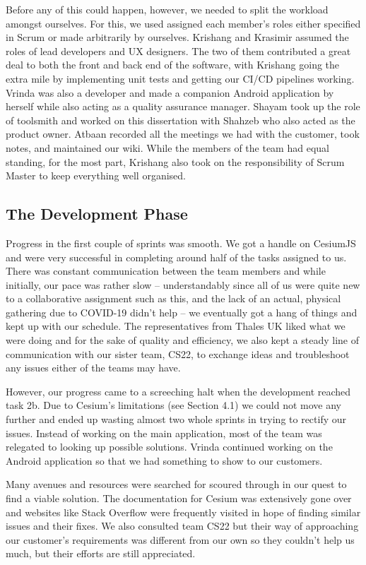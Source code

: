 \documentclass{l3proj}
\begin{document}
Before any of this could happen, however, we needed to split the workload amongst ourselves. For this, we used assigned each member's roles either specified in Scrum or made arbitrarily by ourselves. Krishang and Krasimir assumed the roles of lead developers and UX designers. The two of them contributed a great deal to both the front and back end of the software, with Krishang going the extra mile by implementing unit tests and getting our CI/CD pipelines working. Vrinda was also a developer and made a companion Android application by herself while also acting as a quality assurance manager. Shayam took up the role of toolsmith and worked on this dissertation with Shahzeb who also acted as the product owner. Atbaan recorded all the meetings we had with the customer, took notes, and maintained our wiki. While the members of the team had equal standing, for the most part, Krishang also took on the responsibility of Scrum Master\cite{ScrumMaster} to keep everything well organised.

\subsection{The Development Phase}

Progress in the first couple of sprints was smooth. We got a handle on CesiumJS and were very successful in completing around half of the tasks assigned to us. There was constant communication between the team members and while initially, our pace was rather slow – understandably since all of us were quite new to a collaborative assignment such as this, and the lack of an actual, physical gathering due to COVID-19 didn’t help – we eventually got a hang of things and kept up with our schedule. The representatives from Thales UK liked what we were doing and for the sake of quality and efficiency, we also kept a steady line of communication with our sister team, CS22, to exchange ideas and troubleshoot any issues either of the teams may have.

However, our progress came to a screeching halt when the development reached task 2b. Due to Cesium’s limitations (see Section 4.1) we could not move any further and ended up wasting almost two whole sprints in trying to rectify our issues. Instead of working on the main application, most of the team was relegated to looking up possible solutions. Vrinda continued working on the Android application so that we had something to show to our customers.

Many avenues and resources were searched for scoured through in our quest to find a viable solution. The documentation for Cesium was extensively gone over and websites like Stack Overflow were frequently visited in hope of finding similar issues and their fixes. We also consulted team CS22 but their way of approaching our customer’s requirements was different from our own so they couldn’t help us much, but their efforts are still appreciated.
\end{document}
